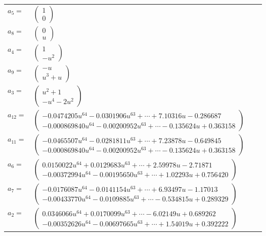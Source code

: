 \documentclass[1p]{elsarticle_modified}
\theoremstyle{definition}
\begin{document}
\begin{tabular}{m{7pt} m{180pt} m{7pt} m{180pt} }
\flushright $a_{5}=$&$\begin{pmatrix}1\\0\end{pmatrix}$ \\
\flushright $a_{8}=$&$\begin{pmatrix}0\\u\end{pmatrix}$ \\
\flushright $a_{4}=$&$\begin{pmatrix}1\\- u^2\end{pmatrix}$ \\
\flushright $a_{9}=$&$\begin{pmatrix}- u\\u^3+u\end{pmatrix}$ \\
\flushright $a_{3}=$&$\begin{pmatrix}u^2+1\\- u^4-2 u^2\end{pmatrix}$ \\
\flushright $a_{12}=$&$\begin{pmatrix}-0.0474205 u^{64}-0.0301906 u^{63}+\cdots+7.10316 u-0.286687\\-0.000869840 u^{64}-0.00200952 u^{63}+\cdots-0.135624 u+0.363158\end{pmatrix}$ \\
\flushright $a_{11}=$&$\begin{pmatrix}-0.0465507 u^{64}-0.0281811 u^{63}+\cdots+7.23878 u-0.649845\\-0.000869840 u^{64}-0.00200952 u^{63}+\cdots-0.135624 u+0.363158\end{pmatrix}$ \\
\flushright $a_{6}=$&$\begin{pmatrix}0.0150022 u^{64}+0.0129683 u^{63}+\cdots+2.59978 u-2.71871\\-0.00372994 u^{64}-0.00195650 u^{63}+\cdots+1.02293 u+0.756420\end{pmatrix}$ \\
\flushright $a_{7}=$&$\begin{pmatrix}-0.0176087 u^{64}-0.0141154 u^{63}+\cdots+6.93497 u-1.17013\\-0.00433770 u^{64}-0.0109885 u^{63}+\cdots-0.534815 u+0.289329\end{pmatrix}$ \\
\flushright $a_{2}=$&$\begin{pmatrix}0.0346066 u^{64}+0.0170099 u^{63}+\cdots-6.02149 u+0.689262\\-0.00352626 u^{64}-0.00697665 u^{63}+\cdots+1.54019 u+0.392222\end{pmatrix}$ \\

\end{tabular}
\end{document}
